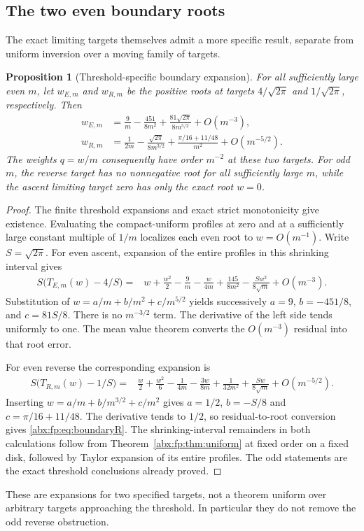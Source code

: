 \documentclass[11pt,letterpaper]{article}
\numberwithin{equation}{section}
\newtheorem{proposition}[theorem]{Proposition}
\theoremstyle{remark}\newtheorem{remark}[theorem]{Remark}
\newcommand{\sq}{\sqrt{2\pi}}
\begin{document}
\subsection{The two even boundary roots}\label{abx:fp:sub:boundary}
The exact limiting targets themselves admit a more specific result,
separate from uniform inversion over a moving family of targets.

\begin{proposition}[Threshold-specific boundary expansion]\label{abx:fp:prop:boundary}
For all sufficiently large even $m$, let $w_{E,m}$ and $w_{R,m}$ be
the positive roots at targets $4/\sq$ and $1/\sq$, respectively.
Then
\begin{align}
 w_{E,m}&=\frac9m-\frac{451}{8m^2}
               +\frac{81\sq}{8m^{5/2}}+O(m^{-3}),\label{abx:fp:eq:boundaryE}\\
 w_{R,m}&=\frac1{2m}-\frac{\sq}{8m^{3/2}}
             +\frac{\pi/16+11/48}{m^2}+O(m^{-5/2}).\label{abx:fp:eq:boundaryR}
\end{align}
The weights $q=w/m$ consequently have order $m^{-2}$ at these two
targets. For odd $m$, the reverse target has no nonnegative root for
all sufficiently large $m$, while the ascent limiting target zero
has only the exact root $w=0$.
\end{proposition}
\begin{proof}
The finite threshold expansions and exact strict monotonicity give
existence. Evaluating the compact-uniform profiles at zero and at a
sufficiently large constant multiple of $1/m$ localizes each even root
to $w=O(m^{-1})$. Write $S=\sq$. For even ascent, expansion of the
entire profiles in this shrinking interval gives
\begin{align}
 S\bigl(T_{E,m}(w)-4/S\bigr)
  ={}&w+\frac{w^2}{2}-\frac9m-\frac{w}{4m}
       +\frac{145}{8m^2}-\frac{S w^2}{8\sqrt m}+O(m^{-3}).
       \label{abx:fp:eq:boundaryEres}
\end{align}
Substitution of $w=a/m+b/m^2+c/m^{5/2}$ yields successively
$a=9$, $b=-451/8$, and $c=81S/8$. There is no $m^{-3/2}$ term.
The derivative of the left side tends uniformly to one. The mean
value theorem converts the $O(m^{-3})$ residual into that root error.

For even reverse the corresponding expansion is
\begin{align}
 S\bigl(T_{R,m}(w)-1/S\bigr)
 ={}&\frac w2+\frac{w^2}{6}-\frac1{4m}-\frac{3w}{8m}
          +\frac1{32m^2}+\frac{S w}{8\sqrt m}+O(m^{-5/2}).
          \label{abx:fp:eq:boundaryRres}
\end{align}
Inserting $w=a/m+b/m^{3/2}+c/m^2$ gives
$a=1/2$, $b=-S/8$ and $c=\pi/16+11/48$.
The derivative tends to $1/2$, so residual-to-root conversion gives
\eqref{abx:fp:eq:boundaryR}. The shrinking-interval remainders in both
calculations follow from Theorem~\ref{abx:fp:thm:uniform} at fixed order on
a fixed disk, followed by Taylor expansion of its entire profiles.
The odd statements are the exact threshold conclusions already proved.
\end{proof}
These are expansions for two specified targets, not a theorem uniform
over arbitrary targets approaching the threshold. In particular they
do not remove the odd reverse obstruction.
\end{document}
